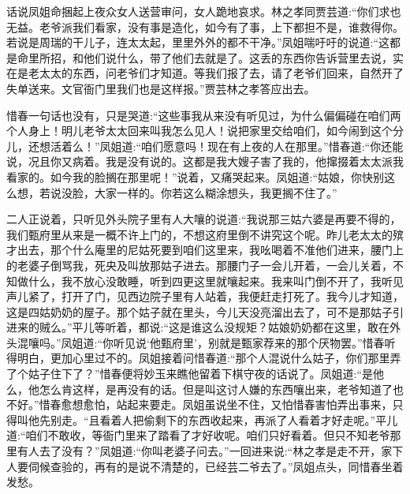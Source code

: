 


\begin{parag}
    话说凤姐命捆起上夜众女人送营审问，女人跪地哀求。林之孝同贾芸道:“你们求也无益。老爷派我们看家，没有事是造化，如今有了事，上下都担不是，谁救得你。若说是周瑞的干儿子，连太太起，里里外外的都不干净。”凤姐喘吁吁的说道:“这都是命里所招，和他们说什么，带了他们去就是了。这丢的东西你告诉营里去说，实在是老太太的东西，问老爷们才知道。等我们报了去，请了老爷们回来，自然开了失单送来。文官衙门里我们也是这样报。”贾芸林之孝答应出去。
\end{parag}


\begin{parag}
    惜春一句话也没有，只是哭道:“这些事我从来没有听见过，为什么偏偏碰在咱们两个人身上！明儿老爷太太回来叫我怎么见人！说把家里交给咱们，如今闹到这个分儿，还想活着么！”凤姐道:“咱们愿意吗！现在有上夜的人在那里。”惜春道:“你还能说，况且你又病着。我是没有说的。这都是我大嫂子害了我的，他撺掇着太太派我看家的。如今我的脸搁在那里呢！”说着，又痛哭起来。凤姐道:“姑娘，你快别这么想，若说没脸，大家一样的。你若这么糊涂想头，我更搁不住了。”
\end{parag}


\begin{parag}
    二人正说着，只听见外头院子里有人大嚷的说道:“我说那三姑六婆是再要不得的，我们甄府里从来是一概不许上门的，不想这府里倒不讲究这个呢。昨儿老太太的殡才出去，那个什么庵里的尼姑死要到咱们这里来，我吆喝着不准他们进来，腰门上的老婆子倒骂我，死央及叫放那姑子进去。那腰门子一会儿开着，一会儿关着，不知做什么，我不放心没敢睡，听到四更这里就嚷起来。我来叫门倒不开了，我听见声儿紧了，打开了门，见西边院子里有人站着，我便赶走打死了。我今儿才知道，这是四姑奶奶的屋子。那个姑子就在里头，今儿天没亮溜出去了，可不是那姑子引进来的贼么。”平儿等听着，都说:“这是谁这么没规矩？姑娘奶奶都在这里，敢在外头混嚷吗。”凤姐道:“你听见说‘他甄府里’，别就是甄家荐来的那个厌物罢。”惜春听得明白，更加心里过不的。凤姐接着问惜春道:“那个人混说什么姑子，你们那里弄了个姑子住下了？”惜春便将妙玉来瞧他留着下棋守夜的话说了。凤姐道:“是他么，他怎么肯这样，是再没有的话。但是叫这讨人嫌的东西嚷出来，老爷知道了也不好。”惜春愈想愈怕，站起来要走。凤姐虽说坐不住，又怕惜春害怕弄出事来，只得叫他先别走。“且看着人把偷剩下的东西收起来，再派了人看着才好走呢。”平儿道:“咱们不敢收，等衙门里来了踏看了才好收呢。咱们只好看着。但只不知老爷那里有人去了没有？”凤姐道:“你叫老婆子问去。”一回进来说:“林之孝是走不开，家下人要伺候查验的，再有的是说不清楚的，已经芸二爷去了。”凤姐点头，同惜春坐着发愁。
\end{parag}


